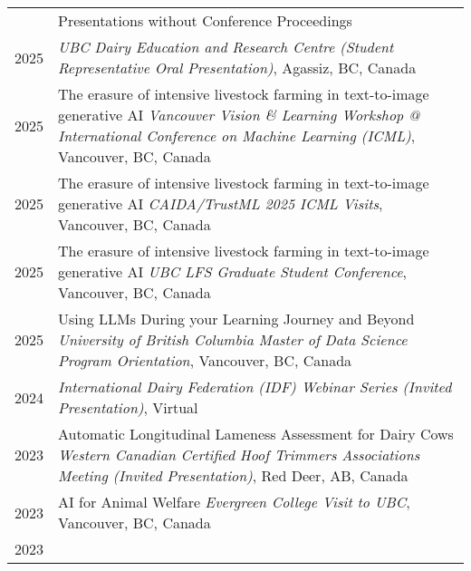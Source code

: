 \documentclass[letterpaper, 11pt]{article}
\newcommand{\headingfont}{\Large\color{OliveGreen}}
\newenvironment{SectionTable}[1]{
	\renewcommand*{\arraystretch}{1.7}
	\setlength{\tabcolsep}{10pt}
	\begin{longtable}{Rp{5.2in}} & #1 \\}
{\end{longtable}\vspace{-.3cm}}
\begin{document}
\begin{SectionTable}{\headingfont Presentations without Conference Proceedings}
2025 &
 \newline
\textit{UBC Dairy Education and Research Centre (Student Representative Oral Presentation)}, Agassiz, BC, Canada \newline
{} \\
2025 &
The erasure of intensive livestock farming in text-to-image generative AI \newline
\textit{Vancouver Vision \& Learning Workshop @ International Conference on Machine Learning (ICML)}, Vancouver, BC, Canada \\
2025 &
The erasure of intensive livestock farming in text-to-image generative AI \newline
\textit{CAIDA/TrustML 2025 ICML Visits}, Vancouver, BC, Canada \\
2025 &
The erasure of intensive livestock farming in text-to-image generative AI \newline
\textit{UBC LFS Graduate Student Conference}, Vancouver, BC, Canada \\
2025 &
Using LLMs During your Learning Journey and Beyond \newline
\textit{University of British Columbia Master of Data Science Program Orientation}, Vancouver, BC, Canada \\
2024 &
 \newline
\textit{International Dairy Federation (IDF) Webinar Series (Invited Presentation)}, Virtual \\
2023 &
Automatic Longitudinal Lameness Assessment for Dairy Cows \newline
\textit{Western Canadian Certified Hoof Trimmers Associations Meeting (Invited Presentation)}, Red Deer, AB, Canada \\
2023 &
AI for Animal Welfare \newline
\textit{Evergreen College Visit to UBC}, Vancouver, BC, Canada \\
2023 &
 \newline

\end{SectionTable}
\end{document}
